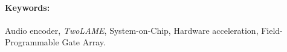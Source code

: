 \paragraph{\hspace{0.5cm} \Large{Keywords:}} Audio encoder, \textit{TwoLAME}, System-on-Chip, Hardware acceleration, Field-Programmable Gate Array.